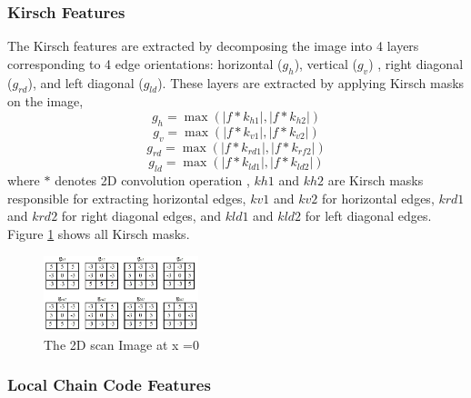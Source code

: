 \documentclass[conference]{IEEEtran}
\begin{document}
\subsubsection {Kirsch Features}
The Kirsch features \cite{Liu2003} are extracted by decomposing the image into 4 layers corresponding to 4 edge orientations: horizontal ($g_h$), vertical ($g_v$) , right diagonal ($g_{rd}$), and left diagonal ($g_{ld}$). These layers are extracted by applying Kirsch masks on the image,
\begin{equation}
 g_h=\max \left( |f*k_{h1}| , |f*k_{h2}| \right)
\label{eq:kirsh1}
\end{equation}
\begin{equation}
 g_v=\max \left( |f*k_{v1}| , |f*k_{v2}| \right)
\label{eq:kirsh1}
\end{equation}
\begin{equation}
 g_{rd}=\max \left( |f*k_{rd1}| , |f*k_{rf2}| \right)
\label{eq:kirsh1}
\end{equation}
\begin{equation}
 g_{ld}=\max \left( |f*k_{ld1}| , |f*k_{ld2}| \right)
\label{eq:kirsh1}
\end{equation}
where $*$ denotes 2D convolution operation \cite{gonzales2002}, $kh1$ and $kh2$ are Kirsch masks responsible for extracting horizontal edges, $kv1$ and $kv2$ for horizontal edges, $krd1$ and $krd2$ for right diagonal edges, and $kld1$ and $kld2$ for left diagonal edges. Figure \ref{fig:kirshMasks} shows all Kirsch masks.

  \begin{figure}
\centering
\label{fig:kirshMasks}
\includegraphics[width=0.40\textwidth]{images/kirshAll.jpg}
 \caption{The 2D scan Image at x =0 }
\end{figure}


\subsubsection {Local Chain Code Features}
\end{document}
